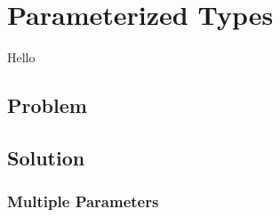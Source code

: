 \chapter{Parameterized Types}

Hello

\section{Problem}
\section{Solution}

\csharpsection{\csharp}
\subsection{Multiple Parameters}


